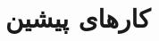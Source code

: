 \chapter{کارهای پیشین}
\label{chap:realtedWork}

\begin{abstract}

\end{abstract}

\section{}
\label{sec:temporalPriv}

